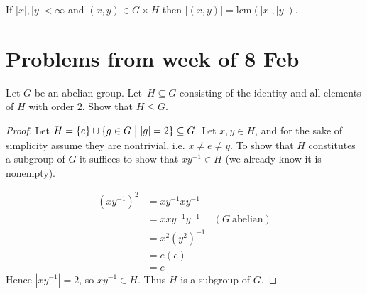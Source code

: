 \begin{thm}
    If $|x|, |y| < \infty$ and $(x,y) \in G \times H$ then 
    $|(x,y)| = \text{lcm}(|x|,|y|)$.
\end{thm}

\newpage 
\section{Problems from week of 8 Feb}
\begin{prob}
    Let $G$ be an abelian group. Let $H \subseteq G$ consisting of the 
    identity and all elements of $H$ with order $2$. Show that 
    $H \leq G$.
\end{prob}
\begin{proof}
    Let $H = \{e\} \cup \{g \in G \bigm| |g| = 2\} \subseteq G$. 
    Let $x,y \in H$, and for the sake of simplicity assume they 
    are nontrivial, i.e. $x\neq e \neq y$. 
    To show that $H$ constitutes a subgroup of $G$ 
    it suffices to show that $xy^{-1} \in H$ (we already 
    know it is nonempty).

    \begin{align*}
        (xy^{-1})^2 &= xy^{-1}xy^{-1} \\ 
                    &= xxy^{-1}y^{-1} &(G \ \text{abelian}) \\ 
                    &= x^2(y^2)^{-1} \\ 
                    &= e(e) \\ 
                    &= e
    \end{align*}
    Hence $|xy^{-1}| = 2$, so $xy^{-1} \in H$.
    Thus $H$ is a subgroup of $G$.
\end{proof}

